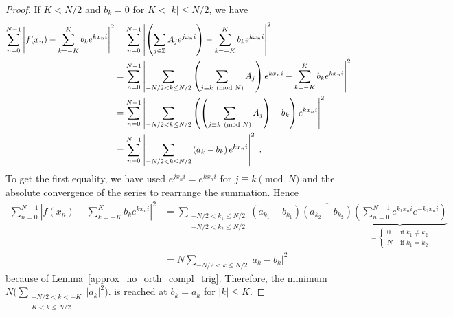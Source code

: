 \begin{proof}
 If $K<N/2$ and $b_k=0$ for $K<|k|\leq N/2$, we have
\begin{align*}
\sum_{n=0}^{N-1} \left| f(x_n) - \sum_{k=-K}^K b_k e^{k x_n i} \right|^2 &= 
\sum_{n=0}^{N-1} \left| \left(\sum_{j\in\mathbb{Z}} A_j e^{j x_n i} \right)
- \sum_{k=-K}^K b_k e^{k x_n i} \right|^2 \\
&=\sum_{n=0}^{N-1} \left| \sum_{-N/2<k\leq N/2}
\left( \sum_{j\equiv k \pmod{N}} A_j \right) e^{k x_n i} - \sum_{k=-K}^K b_k
e^{k x_n i} \right|^2 \\
&= \sum_{n=0}^{N-1} \left| \sum_{-N/2<k\leq N/2}
\left( \left(\sum_{j\equiv k \pmod{N}} A_j\right) - b_k \right) e^{k x_n i}
\right|^2 \\
&= \sum_{n=0}^{N-1} \left| \sum_{-N/2<k\leq N/2}
\left( a_k - b_k \right) e^{k x_n i} \right|^2 \ .
\end{align*}
To get the first equality,
we have used $\displaystyle e^{jx_n i} =  e^{k x_n i}$ for
$j \equiv k \pmod{N}$ and the absolute convergence of the series to
rearrange the summation.  Hence
\begin{align*}
\sum_{n=0}^{N-1} \left| f(x_n) - \sum_{k=-K}^K b_k e^{k x_n i} \right|^2 &= 
\sum_{\substack{-N/2<k_1\leq N/2\\-N/2<k_2\leq N/2}} \left(a_{k_1} - b_{k_1} \right)
\overline{\left(a_{k_2} - b_{k_2} \right)}
\underbrace{\left( \sum_{n=0}^{N-1}  e^{k_1 x_n i} e^{-k_2 x_n i} \right)
}_{= \begin{cases} 0 &\text{ if } k_1 \neq k_2 \\ N &\text{ if } k_1 =
    k_2\end{cases} }  \\
&= N \sum_{-N/2<k\leq N/2} \left|a_k - b_k \right|^2
\end{align*}
because of Lemma~\ref{approx_no_orth_compl_trig}.
Therefore, the minimum
$\displaystyle N \bigg(\sum_{\substack{-N/2<k<-K\\K<k\leq N/2}}
\left|a_k \right|^2\bigg)$. 
is reached at $b_k=a_k$ for $|k| \leq K$.


\end{proof}

